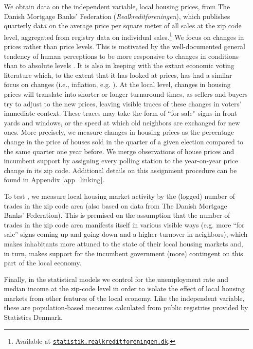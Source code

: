 \documentclass[12pt,a4paper]{article}
\begin{document}
	We obtain data on the independent variable, local housing prices, from The Danish Mortgage Banks' Federation (\textit{Realkreditforeningen}), which publishes quarterly data on the average price per square meter of all sales at the zip code level, aggregated from registry data on individual sales.\footnote{Available at \texttt{\href{http://statistik.realkreditforeningen.dk/}{statistik.realkreditforeningen.dk}}.} We focus on changes in prices rather than price levels. This is motivated by the well-documented general tendency of human perceptions to be more responsive to changes in conditions than to absolute levels \citep{kahneman1979prospect}. It is also in keeping with the extant economic voting literature which, to the extent that it has looked at prices, has had a similar focus on changes (i.e., inflation, e.g. \citealp{kramer1971short}). At the local level, changes in housing prices will translate into shorter or longer turnaround times, as sellers and buyers try to adjust to the new prices, leaving visible traces of these changes in voters’ immediate context. These traces may take the form of ``for sale'' signs in front yards and windows, or the speed at which old neighbors are exchanged for new ones. More precisely, we measure changes in housing prices as the percentage change in the price of houses sold in the quarter of a given election compared to the same quarter one year before. We merge observations of house prices and incumbent support by assigning every polling station to the year-on-year price change in its zip code. Additional details on this assignment procedure can be found in Appendix \ref{app_linking}.
	
	To test \htwo, we measure local housing market activity by the (logged) number of trades in the zip code area (also based on data from The Danish Mortgage Banks' Federation). This is premised on the assumption that the number of trades in the zip code area manifests itself in various visible ways (e.g. more ``for sale'' signs coming up and going down and a higher turnover in neighbors), which makes inhabitants more attuned to the state of their local housing markets and, in turn, makes support for the incumbent government (more) contingent on this part of the local economy.
	
	Finally, in the statistical models we control for the unemployment rate and median income at the zip-code level in order to isolate the effect of local housing markets from other features of the local economy. Like the independent variable, these are population-based measures calculated from public registries provided by Statistics Denmark.
	
\end{document}
